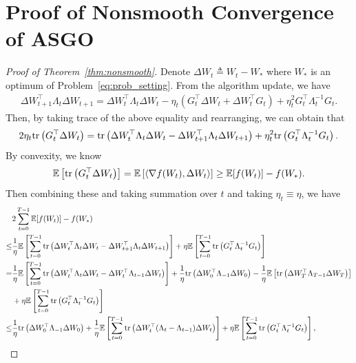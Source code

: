 \documentclass{article}
\theoremstyle{remark}
\newcommand{\dotprod}[2]{\left\langle#1,#2\right\rangle}
\newcommand{\tr}[1]{{\rm tr}\left( #1 \right)}
\newcommand{\EE}{\mathbb{E}}
\newcommand{\tW}{\Delta W}
\begin{document}
\section{Proof of Nonsmooth Convergence of ASGO}\label{appendix:proof_nonsmooth}
\begin{proof}[Proof of Theorem~\ref{thm:nonsmooth}]
Denote $\tW_t \triangleq W_t - W_*$ where $W_*$ is an optimum of Problem~\eqref{eq:prob_setting}. From the algorithm update, we have
\begin{align*}
    \tW_{t+1}^\top \Lambda_t \tW_{t+1} = \tW_{t}^\top \Lambda_t \tW_{t} - \eta_t \left( G_t^\top \tW_t + \tW_t^\top G_t \right) + \eta_t^2 G_t^\top \Lambda_t^{-1} G_t .
\end{align*}
Then, by taking trace of the above equality and rearranging, we can obtain that
\begin{align*}
    2\eta_t \tr{G_t^\top \tW_t} = \tr{\tW_{t}^\top \Lambda_t \tW_{t} - \tW_{t+1}^\top \Lambda_t \tW_{t+1}} + \eta_t^2 \tr{G_t^\top \Lambda_t^{-1} G_t}.
\end{align*}
By convexity, we know
\begin{align*}
    \EE\left[\tr{G_t^\top \tW_t}\right] = \EE\left[ \dotprod{\nabla f(W_t)}{\tW_t} \right] \ge \EE[ f(W_t) ] -f(W_*) .
\end{align*}
Then combining these and taking summation over $t$ and taking $\eta_t \equiv \eta$, we have
\begin{align}\label{eq:proof_thm_convex_nonsmooth_main}
\begin{split}
    &2\sum_{t=0}^{T-1} \EE[f(W_t)] -f(W_*) \\
    \le& \frac{1}{\eta} \EE\left[ \sum_{t=0}^{T-1} \tr{\tW_{t}^\top \Lambda_t \tW_{t} - \tW_{t+1}^\top \Lambda_t \tW_{t+1}} \right] + \eta \EE\left[ \sum_{t=0}^{T-1} \tr{G_t^\top \Lambda_t^{-1} G_t} \right] \\
    =&
    \frac{1}{\eta} \EE\left[ \sum_{t=0}^{T-1} \tr{\tW_{t}^\top \Lambda_t \tW_{t} - \tW_{t}^\top \Lambda_{t-1} \tW_{t}} \right] + \frac{1}{\eta} \tr{\tW_0^\top \Lambda_{-1} \tW_0} - \frac{1}{\eta} \EE\left[ \tr{\tW_T^\top \Lambda_{T-1} \tW_T} \right] \\
    &+ \eta \EE\left[ \sum_{t=0}^{T-1} \tr{G_t^\top \Lambda_t^{-1} G_t} \right] \\
    \le&
    \frac{1}{\eta} \tr{\tW_0^\top \Lambda_{-1} \tW_0} + \frac{1}{\eta} \EE\left[ \sum_{t=0}^{T-1} \tr{\tW_{t}^\top (\Lambda_t - \Lambda_{t-1}) \tW_{t} } \right] + \eta \EE\left[ \sum_{t=0}^{T-1} \tr{G_t^\top \Lambda_t^{-1} G_t} \right] ,
\end{split}

\end{align}
\end{proof}
\end{document}
